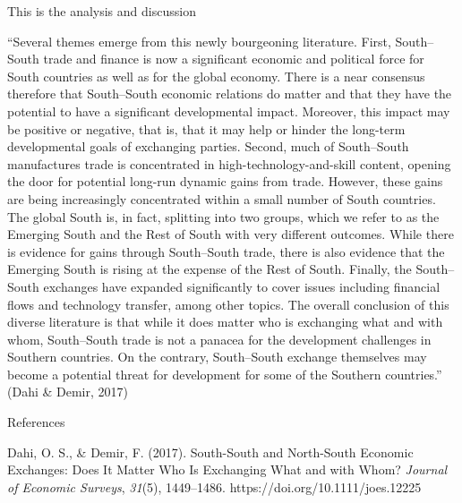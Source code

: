 This is the analysis and discussion

``Several themes emerge from this newly bourgeoning literature. First,
South--South trade and finance is now a significant economic and
political force for South countries as well as for the global economy.
There is a near consensus therefore that South--South economic relations
do matter and that they have the potential to have a significant
developmental impact. Moreover, this impact may be positive or negative,
that is, that it may help or hinder the long-term developmental goals of
exchanging parties. Second, much of South--South manufactures trade is
concentrated in high-technology-and-skill content, opening the door for
potential long-run dynamic gains from trade. However, these gains are
being increasingly concentrated within a small number of South
countries. The global South is, in fact, splitting into two groups,
which we refer to as the Emerging South and the Rest of South with very
different outcomes. While there is evidence for gains through
South--South trade, there is also evidence that the Emerging South is
rising at the expense of the Rest of South. Finally, the South--South
exchanges have expanded significantly to cover issues including
financial flows and technology transfer, among other topics. The overall
conclusion of this diverse literature is that while it does matter who
is exchanging what and with whom, South--South trade is not a panacea
for the development challenges in Southern countries. On the contrary,
South--South exchange themselves may become a potential threat for
development for some of the Southern countries.'' (Dahi \& Demir, 2017)

References

Dahi, O. S., \& Demir, F. (2017). South-South and North-South Economic
Exchanges: Does It Matter Who Is Exchanging What and with Whom?
\emph{Journal of Economic Surveys}, \emph{31}(5), 1449--1486.
https://doi.org/10.1111/joes.12225
